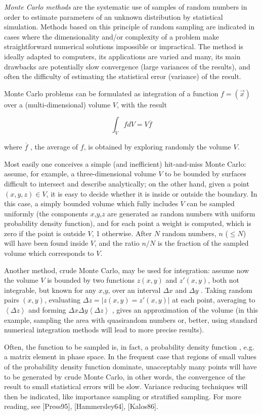 \documentclass[12pt]{article}
\begin{document}
\emph{Monte Carlo methods} are the systematic use of samples of random numbers in order to estimate parameters of an unknown distribution by statistical simulation. Methods based on this principle of random sampling are indicated in cases where the dimensionality and/or complexity of a problem make straightforward numerical solutions impossible or impractical. The method is ideally adapted to computers, its applications are varied and many, its main drawbacks are potentially slow convergence (large variances of the results), and often the difficulty of estimating the statistical error (variance) of the result.

Monte Carlo problems can be formulated as integration of a function $f=(\vec{x})$ over a (multi-dimensional) volume $V$, with the result

$$ \int_V f dV = V \overline{f} $$

where $\overline{f}$ , the average of $f$, is obtained by exploring randomly the volume $V$.

Most easily one conceives a simple (and inefficient) hit-and-miss Monte Carlo: assume, for example, a three-dimensional volume $V$ to be bounded by surfaces difficult to intersect and describe analytically; on the other hand, given a point $(x,y,z)\in V$, it is easy to decide whether it is inside or outside the boundary. In this case, a simply bounded volume which fully includes $V$ can be sampled uniformly (the components $x$,$y$,$z$ are generated as random numbers with uniform probability density function), and for each point a weight is computed, which is zero if the point is outside $V$, 1 otherwise. After $N$ random numbers, $n$ ($\le N$) will have been found inside $V$, and the ratio $n/N$ is the fraction of the sampled volume which corresponds to $V$.

Another method, crude Monte Carlo, may be used for integration: assume now the volume $V$ is bounded by two functions $z(x,y)$ and $z'(x,y)$, both not integrable, but known for any $x$,$y$, over an interval $\Delta x$ and $\Delta y$ . Taking random pairs $(x,y)$, evaluating $\Delta z = | z(x,y)=z'(x,y)|$ at each point, averaging to $\left<\Delta z\right>$ and forming $\Delta x \Delta y \left<\Delta z\right>$ , gives an approximation of the volume (in this example, sampling the area with quasirandom numbers or, better, using standard numerical integration methods will lead to more precise results).

Often, the function to be sampled is, in fact, a probability density function , e.g. a matrix element in phase space. In the frequent case that regions of small values of the probability density function dominate, unacceptably many points will have to be generated by crude Monte Carlo, in other words, the convergence of the result to small statistical errors will be slow. Variance reducing techniques will then be indicated, like importance sampling or stratified sampling. For more reading, see [Press95], [Hammersley64], [Kalos86].
\end{document}
